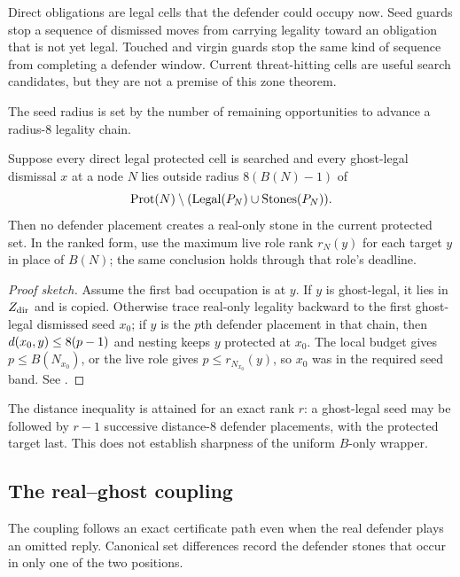 \begin{plainterms}
Direct obligations are legal cells that the defender could occupy now.  Seed
guards stop a sequence of dismissed moves from carrying legality toward an
obligation that is not yet legal.  Touched and virgin guards stop the same
kind of sequence from completing a defender window.  Current threat-hitting
cells are useful search candidates, but they are not a premise of this zone
theorem.
\end{plainterms}

The seed radius is set by the number of remaining opportunities to advance a
radius-$8$ legality chain.

\begin{lemma}
\label{lem:L9prime}
Suppose every direct legal protected cell is searched and every ghost-legal
dismissal $x$ at a node $N$ lies outside radius $8(B(N)-1)$ of
\[
  \operatorname{Prot}(N)\setminus(\operatorname{Legal}(P_N)\cup\operatorname{Stones}(P_N)).
\]
Then no defender placement creates a real-only stone in the current protected
set.  In the ranked form, use the maximum live role rank $r_N(y)$ for each
target $y$ in place of $B(N)$; the same conclusion holds through that role's
deadline.
\end{lemma}

\begin{proof}[Proof sketch]
Assume the first bad occupation is at $y$.  If $y$ is ghost-legal, it lies in
$Z_{\mathrm{dir}}$ and is copied.  Otherwise trace real-only legality backward to the
first ghost-legal dismissed seed $x_0$; if $y$ is the $p$th defender placement
in that chain, then $d(x_0,y)\le8(p-1)$ and nesting keeps $y$ protected at
$x_0$.  The local budget gives $p\le B(N_{x_0})$, or the live role gives
$p\le r_{N_{x_0}}(y)$, so $x_0$ was in the required seed band.  See
\cite{hexobot-companions}.
\end{proof}

The distance inequality is attained for an exact rank $r$: a ghost-legal seed
may be followed by $r-1$ successive distance-$8$ defender placements, with
the protected target last.  This does not establish sharpness of the uniform
$B$-only wrapper.

\subsection{The real--ghost coupling}

The coupling follows an exact certificate path even when the real defender
plays an omitted reply.  Canonical set differences record the defender stones
that occur in only one of the two positions.

